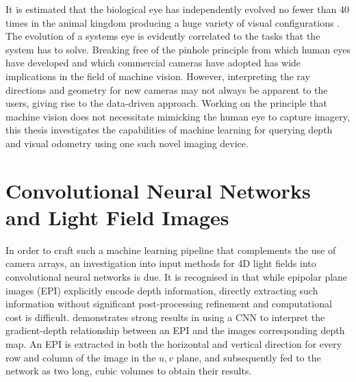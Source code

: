 \documentclass[openany]{book}
\begin{document}
It is estimated that the biological eye has independently evolved no fewer than 40 times in the animal kingdom producing a huge variety of visual configurations \cite{neumann2002polydioptric}. The evolution of a systems eye is evidently correlated to the tasks that the system has to solve. Breaking free of the pinhole principle from which human eyes have developed and which commercial cameras have adopted has wide implications in the field of machine vision. However, interpreting the ray directions and geometry for new cameras may not always be apparent to the users, giving rise to the data-driven approach. Working on the principle that machine vision does not necessitate mimicking the human eye to capture imagery, this thesis investigates the capabilities of machine learning for querying depth and visual odometry using one such novel imaging device. 



\section{Convolutional Neural Networks and Light Field Images}

In order to craft such a machine learning pipeline that complements the use of camera arrays, an investigation into input methods for 4D light fields into convolutional neural networks is due. It is recognised in \cite{sun2016lfdepthcnn} that while epipolar plane images (EPI) explicitly encode depth information, directly extracting such information without significant post-processing refinement and computational cost is difficult. \cite{sun2016lfdepthcnn} demonstrates strong results in using a CNN to interpret the gradient-depth relationship between an EPI and the images corresponding depth map. An EPI is extracted in both the horizontal and vertical direction for every row and column of the image in the $u, v$ plane, and subsequently fed to the network as two long, cubic volumes to obtain their results.
\end{document}
